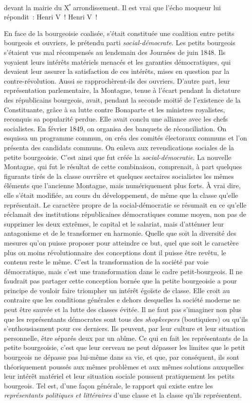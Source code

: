 \documentclass[french,twoside]{book} %
\begin{document}
devant la mairie du X\textsuperscript{ᵉ} arrondissement. Il est vrai que l’écho moqueur lui répondit : Henri V ! Henri V !\par
En face de la bourgeoisie coalisée, s’était constituée une coalition entre petits bourgeois et ouvriers, le prétendu parti \emph{social-démocrate}. Les petits bourgeois s’étaient vus mal récompensés au lendemain des Journées de juin 1848. Ils voyaient leurs intérêts matériels menacés et les garanties démocratiques, qui devaient leur assurer la satisfaction de ces intérêts, mises en question par la contre-révolution. Aussi se rapprochèrent-ils des ouvriers. D’autre part, leur représentation parlementaire, la Montagne, tenue à l’écart pendant la dictature des républicains bourgeois, avait, pendant la seconde moitié de l’existence de la Constituante, grâce à sa lutte contre Bonaparte et les ministres royalistes, reconquis sa popularité perdue. Elle avait conclu une alliance avec les chefs socialistes. En février 1849, on organisa des banquets de réconciliation. On esquissa un programme commun, on créa des comités électoraux communs et l’on présenta des candidats communs. On enleva aux revendications sociales de la petite bourgeoisie. C’est ainsi que fut créée la \emph{social-démocratie}. La nouvelle Montagne, qui fut le résultat de cette combinaison, comprenait, à part quelques figurants tirés de la classe ouvrière et quelques sectaires socialistes les mêmes éléments que l’ancienne Montagne, mais numériquement plus forts. À vrai dire, elle s’était modifiée, au cours du développement, de même que la classe qu’elle représentait. Le caractère propre de la social-démocratie se résumait en ce qu’elle réclamait des institutions républicaines démocratiques comme moyen, non pas de supprimer les deux extrêmes, le capital et le salariat, mais d’atténuer leur antagonisme et de le transformer en harmonie. Quelle que soit la diversité des mesures qu’on puisse proposer pour atteindre ce but, quel que soit le caractère plus ou moins révolutionnaire des conceptions dont il puisse être revêtu, le contenu reste le même. C’est la transformation de la société par voie démocratique, mais c’est une transformation dans le cadre petit-bourgeois. Il ne faudrait pas partager cette conception bornée que la petite bourgeoisie a pour principe de vouloir faire triompher un intérêt égoïste de classe. Elle croit au contraire que les conditions générales e dehors desquelles la société moderne ne peut être sauvée et la lutte des classes évitée. Il ne faut pas s’imaginer non plus que les représentants démocrates sont tous des \emph{shopkeepers} (boutiquiers) ou qu’ils s’enthousiasment pour ces derniers. Ils peuvent, par leur culture et leur situation personnelle, être séparés deux par un abîme. Ce qui en fait les représentants de la petite bourgeoisie, c’est que leur cerveau ne peut dépasser les limites que le petit bourgeois ne dépasse pas lui-même dans sa vie, et que, par conséquent, ils sont théoriquement poussés aux mêmes problèmes et aux mêmes solutions auxquelles leur intérêt matériel et leur situation sociale poussent pratiquement les petits bourgeois. Tel est, d’une façon générale, le rapport qui existe entre les \emph{représentants politiques et littéraires} d’une classe et la classe qu’ils représentent.\par
\end{document}
